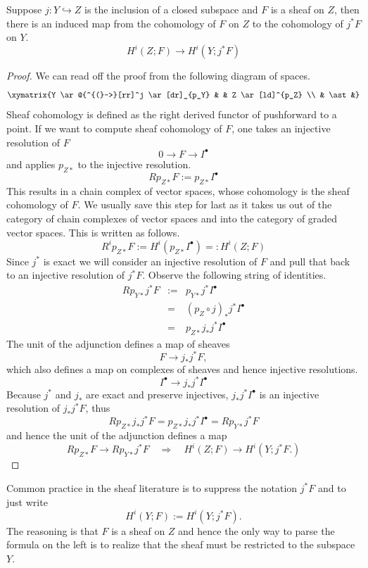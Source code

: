 \begin{lem}
	Suppose $j:Y\hookrightarrow Z$ is the inclusion of a closed subspace and $F$ is a sheaf on $Z$, then there is an induced map from the cohomology of $F$ on $Z$ to the cohomology of $j^*F$ on $Y$.
	\[
		H^i(Z;F)\to H^i(Y;j^*F)
	\]
\end{lem}
\begin{proof}
	We can read off the proof from the following diagram of spaces.
	\[
		\xymatrix{Y \ar@{^{(}->}[rr]^j \ar[dr]_{p_Y} & & Z \ar[ld]^{p_Z} \\ & \ast &}
	\]
	Sheaf cohomology is defined as the right derived functor of pushforward to a point. If we want to compute sheaf cohomology of $F$, one takes an injective resolution of $F$ 
	\[
		0\to F\to I^{\bullet}
	\]
	and applies $p_{Z*}$ to the injective resolution.
	\[
		Rp_{Z*}F:= p_{Z*}I^{\bullet}
	\]
	This results in a chain complex of vector spaces, whose cohomology is the sheaf cohomology of $F$. We usually save this step for last as it takes us out of the category of chain complexes of vector spaces and into the category of graded vector spaces. This is written as follows.
	\[
		R^ip_{Z*}F:=H^i(p_{Z*}I^{\bullet})=:H^i(Z;F)
	\]
	Since $j^*$ is exact we will consider an injective resolution of $F$ and pull that back to an injective resolution of $j^*F$. Observe the following string of identities.
	\begin{eqnarray*}
		Rp_{Y*}j^* F &:=& p_{Y*}j^*I^{\bullet} \\
		&=& (p_{Z}\circ j)_* j^*I^{\bullet} \\
		&=& p_{Z*}j_*j^* I^{\bullet}
	\end{eqnarray*}
	The unit of the adjunction defines a map of sheaves
	\[
		F \to j_*j^*F,
	\]
	which also defines a map on complexes of sheaves and hence injective resolutions.
	\[
		I^{\bullet}\to j_*j^*I^{\bullet}
	\]
	Because $j^*$ and $j_*$ are exact and preserve injectives, $j_*j^*I^{\bullet}$ is an injective resolution of $j_*j^*F$, thus
	\[
		Rp_{Z*}j_* j^* F= p_{Z*}j_*j^* I^{\bullet}= Rp_{Y*}j^* F
	\]
	and hence the unit of the adjunction defines a map
	\[
		Rp_{Z*} F\to Rp_{Y*}j^*F \quad \Rightarrow \quad H^i(Z;F)\to H^i(Y;j^*F.)
	\]
\end{proof}
\begin{rmk}
	Common practice in the sheaf literature is to suppress the notation $j^*F$ and to just write
	\[
		H^i(Y;F):=H^i(Y;j^*F).
	\]
	The reasoning is that $F$ is a sheaf on $Z$ and hence the only way to parse the formula on the left is to realize that the sheaf must be restricted to the subspace $Y$.
\end{rmk}

